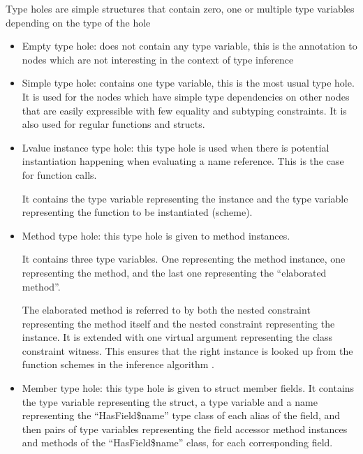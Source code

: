 \begin{defn}
    Type holes are simple structures that contain zero, one or multiple type variables depending on the type of the hole

    \begin{itemize}
        \item Empty type hole: does not contain any type variable, this is the annotation to nodes which are not interesting in the context of type inference 
        
        \item Simple type hole: contains one type variable, this is the most usual type hole. It is used for the nodes which have simple type dependencies on other nodes that are easily expressible with few equality and subtyping constraints. It is also used for regular functions and structs.
        
        \item Lvalue instance type hole: this type hole is used when there is potential instantiation happening when evaluating a name reference. This is the case for function calls.
        
        It contains the type variable representing the instance and the type variable representing the function to be instantiated (scheme).

        \item Method type hole: this type hole is given to method instances. 
        
        It contains three type variables. One representing the method instance, one representing the method, and the last one representing the ``elaborated method''.
        
        The elaborated method is referred to by both the nested constraint representing the method itself and the nested constraint representing the instance. It is extended with one virtual argument representing the class constraint witness. This ensures that the right instance is looked up from the function schemes in the inference algorithm . 

        \item Member type hole: this type hole is given to struct member fields. It contains the type variable representing the struct, a type variable and a name representing the ``HasField\$name'' type class of each alias of the field, and then pairs of type variables representing the field accessor method instances and methods of the  ``HasField\$name'' class, for each corresponding field.
    \end{itemize}
\end{defn}

